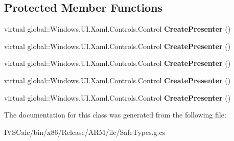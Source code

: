 \subsection*{Protected Member Functions}
\begin{DoxyCompactItemize}
\item 
\mbox{\label{class_windows_1_1_u_i_1_1_xaml_1_1_controls_1_1_primitives_1_1_flyout_base_aafc201eee96276d95bcc008b754de403}} 
virtual global\+::\+Windows.\+U\+I.\+Xaml.\+Controls.\+Control {\bfseries Create\+Presenter} ()
\item 
\mbox{\label{class_windows_1_1_u_i_1_1_xaml_1_1_controls_1_1_primitives_1_1_flyout_base_aafc201eee96276d95bcc008b754de403}} 
virtual global\+::\+Windows.\+U\+I.\+Xaml.\+Controls.\+Control {\bfseries Create\+Presenter} ()
\item 
\mbox{\label{class_windows_1_1_u_i_1_1_xaml_1_1_controls_1_1_primitives_1_1_flyout_base_aafc201eee96276d95bcc008b754de403}} 
virtual global\+::\+Windows.\+U\+I.\+Xaml.\+Controls.\+Control {\bfseries Create\+Presenter} ()
\item 
\mbox{\label{class_windows_1_1_u_i_1_1_xaml_1_1_controls_1_1_primitives_1_1_flyout_base_aafc201eee96276d95bcc008b754de403}} 
virtual global\+::\+Windows.\+U\+I.\+Xaml.\+Controls.\+Control {\bfseries Create\+Presenter} ()
\item 
\mbox{\label{class_windows_1_1_u_i_1_1_xaml_1_1_controls_1_1_primitives_1_1_flyout_base_aafc201eee96276d95bcc008b754de403}} 
virtual global\+::\+Windows.\+U\+I.\+Xaml.\+Controls.\+Control {\bfseries Create\+Presenter} ()
\end{DoxyCompactItemize}


The documentation for this class was generated from the following file\+:\begin{DoxyCompactItemize}
\item 
I\+V\+S\+Calc/bin/x86/\+Release/\+A\+R\+M/ilc/Safe\+Types.\+g.\+cs\end{DoxyCompactItemize}
